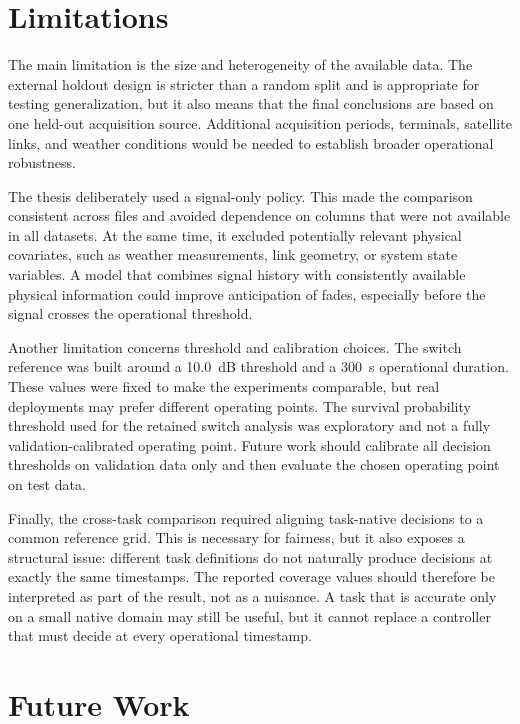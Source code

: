 \section{Limitations}

The main limitation is the size and heterogeneity of the available data. The
external holdout design is stricter than a random split and is appropriate for
testing generalization, but it also means that the final conclusions are based
on one held-out acquisition source. Additional acquisition periods, terminals,
satellite links, and weather conditions would be needed to establish broader
operational robustness.

The thesis deliberately used a signal-only policy. This made the comparison
consistent across files and avoided dependence on columns that were not
available in all datasets. At the same time, it excluded potentially relevant
physical covariates, such as weather measurements, link geometry, or system
state variables. A model that combines signal history with consistently
available physical information could improve anticipation of fades, especially
before the signal crosses the operational threshold.

Another limitation concerns threshold and calibration choices. The switch
reference was built around a \SI{10.0}{dB} threshold and a
\SI{300}{s} operational duration. These values were fixed to make the
experiments comparable, but real deployments may prefer different operating
points. The survival probability threshold used for the retained switch
analysis was exploratory and not a fully validation-calibrated operating
point. Future work should calibrate all decision thresholds on validation data
only and then evaluate the chosen operating point on test data.

Finally, the cross-task comparison required aligning task-native decisions to a
common reference grid. This is necessary for fairness, but it also exposes a
structural issue: different task definitions do not naturally produce
decisions at exactly the same timestamps. The reported coverage values should
therefore be interpreted as part of the result, not as a nuisance. A task that
is accurate only on a small native domain may still be useful, but it cannot
replace a controller that must decide at every operational timestamp.

\section{Future Work}


